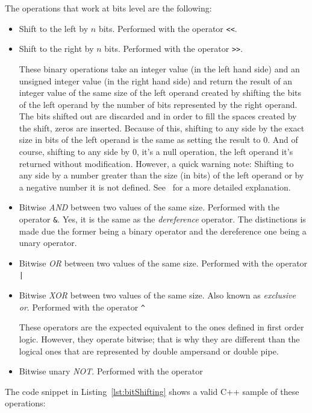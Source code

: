 The operations that work at bits level are the following:
\begin{itemize}
\item Shift to the left by $n$ bits. Performed with the operator \texttt{<<}.
\item Shift to the right by $n$ bits. Performed with the operator \texttt{>>}.

These binary operations take an integer value (in the left hand side) and an unsigned integer value (in the right hand side) and return the result of an integer value of the same size of the left operand created by shifting the bits of the left operand by the number of bits represented by the right operand.
The bits shifted out are discarded and in order to fill the spaces created by the shift, zeros are inserted.
Because of this, shifting to any side by the exact size in bits of the left operand is the same as setting the result to 0.
And of course, shifting to any side by 0, it's a null operation, the left operand it's returned without modification.
However, a quick warning note: Shifting to any side by a number greater than the size (in bits) of the left operand or by a negative number it is not defined.
See~\cite{INT34Cpp} for a more detailed explanation.
\item Bitwise \emph{AND} between two values of the same size.
      Performed with the operator \texttt{&}.
      Yes, it is the same as the \emph{dereference} operator.
      The distinctions is made due the former being a binary operator and the dereference one being a unary operator.
\item Bitwise \emph{OR} between two values of the same size.
      Performed with the operator \texttt{|}
\item Bitwise \emph{XOR} between two values of the same size.
      Also known as \emph{exclusive or}.
      Performed with the operator \texttt{^}

These operators are the expected equivalent to the ones defined in first order logic.
However, they operate bitwise; that is why they are different than the logical ones that are represented by double ampersand or double pipe.

\item Bitwise unary \emph{NOT}.
      Performed with the operator \texttt{~}
\end{itemize}

The code snippet in Listing~\ref{lst:bitShifting} shows a valid C++ sample of these operations:

